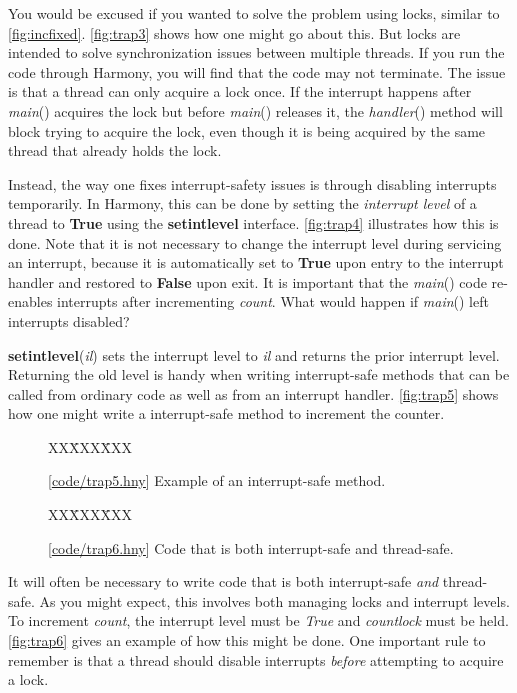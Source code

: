 \documentclass{report}
\newcommand{\harmonysource}[1]{
\begin{tabbing}
XX\=XXX\=XXX\kill
    
\end{tabbing}
}
\newcommand{\harmonylink}[1]{%
[\href{https://harmony.cs.cornell.edu/#1}{\underline{#1}}]%
}
\newenvironment{code}{
\tcolorbox
}{
\endtcolorbox
}
\begin{document}
You would be excused if you wanted to solve the problem using locks, similar to
\autoref{fig:incfixed}.  \autoref{fig:trap3} shows how one might go about this.
But locks are intended to solve synchronization issues between multiple threads.
If you run the code through Harmony, you will find that the code may not terminate.
The issue is that a thread can only acquire a lock once.  If the interrupt happens
after \textit{main}() acquires the lock but before \textit{main}() releases it, the
\textit{handler}() method will block trying to acquire the lock, even though
it is being acquired by the same thread that already holds the lock.

Instead, the way one fixes interrupt-safety issues is through disabling interrupts
temporarily.  In Harmony, this can be done by setting the \textit{interrupt level}
of a thread to \textbf{True} using the \textbf{setintlevel} interface.
\autoref{fig:trap4} illustrates how this is done.
Note that it is not necessary to change the interrupt level during servicing an
interrupt, because it is automatically set to \textbf{True} upon entry to the interrupt
handler and restored to \textbf{False} upon exit.
It is important that the \textit{main}() code re-enables interrupts after incrementing
\textit{count}.  What would happen if \textit{main}() left interrupts disabled?

\textbf{setintlevel}(\textit{il}) sets the interrupt level to \textit{il} and returns
the prior interrupt level.  Returning the old level is handy when writing interrupt-safe
methods that can be called from ordinary code as well as from an interrupt handler.
\autoref{fig:trap5} shows how one might write a interrupt-safe method
to increment the counter.

\begin{figure}
\begin{code}
\harmonysource{trap5}
\end{code}
\caption{\harmonylink{code/trap5.hny} Example of an interrupt-safe method.}
\label{fig:trap5}
\end{figure}

\begin{figure}
\begin{code}
\harmonysource{trap6}
\end{code}
\caption{\harmonylink{code/trap6.hny} Code that is both interrupt-safe and thread-safe.}
\label{fig:trap6}
\end{figure}

It will often be necessary to write code that is both interrupt-safe \emph{and}
thread-safe.  As you might expect, this involves both managing locks and
interrupt levels.
To increment \textit{count}, the interrupt level must be \textit{True} and
\textit{countlock} must be held.
\autoref{fig:trap6} gives an example of how this might be done.
One important rule to remember is that a thread should disable interrupts \emph{before}
attempting to acquire a lock.
\end{document}
